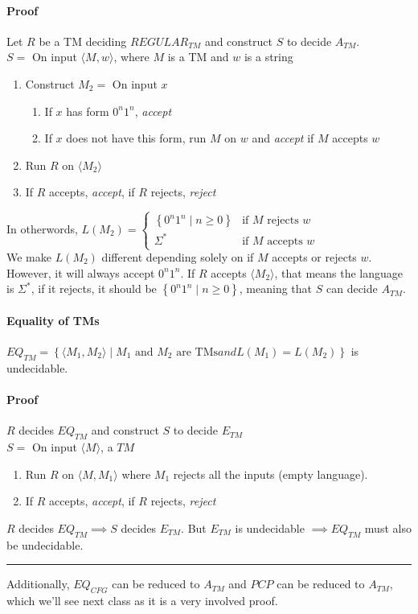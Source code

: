\documentclass[12 pt]{article}
\begin{document}
\paragraph{Proof} Let $R$ be a TM deciding $REGULAR_{TM}$ and
construct $S$ to decide $A_{TM}$.
\\ $S = $ On input $\langle M,w \rangle$, where $M$ is a TM and $w$ is
a string
\begin{enumerate}
\item Construct $M_2 =$ On input $x$
  \begin{enumerate}
  \item If $x$ has form $0^n1^n$, \textit{accept}
  \item If $x$ does not have this form, run $M$ on $w$ and
    \textit{accept} if $M$ accepts $w$
  \end{enumerate}
\item Run $R$ on $\langle M_2 \rangle$
\item If $R$ accepts, \textit{accept}, if $R$ rejects, \textit{reject}
\end{enumerate}
In otherwords, $\displaystyle L(M_2) =
\begin{cases}
  \left\{0^n1^n \mid n \geq 0\right\} & \text{if }M \text{ rejects }w
  \\ \Sigma^* & \text{if }M \text{ accepts }w
\end{cases}
$ \\We make $L(M_2)$ different depending solely on if $M$ accepts or
rejects $w$. However, it will always accept $0^n1^n$. If $R$ accepts
$\langle M_2 \rangle$, that means the language is $\Sigma^*$, if it
rejects, it should be $\left\{0^n1^n \mid n \geq 0\right\}$, meaning
that $S$ can decide $A_{TM}$.
\paragraph{Equality of TMs}
$EQ_{TM} = \left\{\langle M_1,M_2 \rangle \mid M_1 \text{ and }M_2
  \text{ are TMs} and L(M_1) = L(M_2)\right\}$ is undecidable.
\paragraph{Proof} $R$ decides $EQ_{TM}$ and construct $S$ to decide
$E_{TM}$
\\ $S = $ On input $\langle M \rangle$, a $TM$
\begin{enumerate}
\item Run $R$ on $\langle M, M_1 \rangle$ where $M_1$ rejects all the
  inputs (empty language).
\item If $R$ accepts, \textit{accept}, if $R$ rejects, \textit{reject}
\end{enumerate}
$R$ decides $EQ_{TM} \implies S$ decides $E_{TM}$. But $E_{TM}$ is
undecidable $\implies EQ_{TM}$ must also be undecidable.
\\ \noindent \rule{\textwidth}{0.5pt}
Additionally, $EQ_{CFG}$ can be reduced to $A_{TM}$ and $PCP$ can be
reduced to $A_{TM}$, which we'll see next class as it is a very
involved proof.
\end{document}
